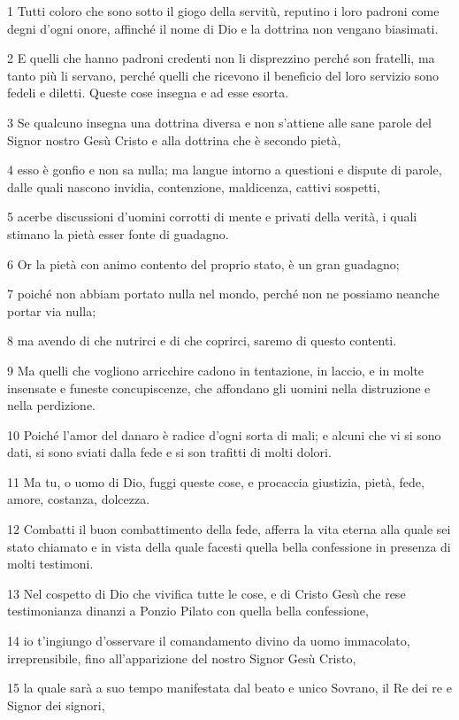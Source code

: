 \par 1 Tutti coloro che sono sotto il giogo della servitù, reputino i loro padroni come degni d'ogni onore, affinché il nome di Dio e la dottrina non vengano biasimati.
\par 2 E quelli che hanno padroni credenti non li disprezzino perché son fratelli, ma tanto più li servano, perché quelli che ricevono il beneficio del loro servizio sono fedeli e diletti. Queste cose insegna e ad esse esorta.
\par 3 Se qualcuno insegna una dottrina diversa e non s'attiene alle sane parole del Signor nostro Gesù Cristo e alla dottrina che è secondo pietà,
\par 4 esso è gonfio e non sa nulla; ma langue intorno a questioni e dispute di parole, dalle quali nascono invidia, contenzione, maldicenza, cattivi sospetti,
\par 5 acerbe discussioni d'uomini corrotti di mente e privati della verità, i quali stimano la pietà esser fonte di guadagno.
\par 6 Or la pietà con animo contento del proprio stato, è un gran guadagno;
\par 7 poiché non abbiam portato nulla nel mondo, perché non ne possiamo neanche portar via nulla;
\par 8 ma avendo di che nutrirci e di che coprirci, saremo di questo contenti.
\par 9 Ma quelli che vogliono arricchire cadono in tentazione, in laccio, e in molte insensate e funeste concupiscenze, che affondano gli uomini nella distruzione e nella perdizione.
\par 10 Poiché l'amor del danaro è radice d'ogni sorta di mali; e alcuni che vi si sono dati, si sono sviati dalla fede e si son trafitti di molti dolori.
\par 11 Ma tu, o uomo di Dio, fuggi queste cose, e procaccia giustizia, pietà, fede, amore, costanza, dolcezza.
\par 12 Combatti il buon combattimento della fede, afferra la vita eterna alla quale sei stato chiamato e in vista della quale facesti quella bella confessione in presenza di molti testimoni.
\par 13 Nel cospetto di Dio che vivifica tutte le cose, e di Cristo Gesù che rese testimonianza dinanzi a Ponzio Pilato con quella bella confessione,
\par 14 io t'ingiungo d'osservare il comandamento divino da uomo immacolato, irreprensibile, fino all'apparizione del nostro Signor Gesù Cristo,
\par 15 la quale sarà a suo tempo manifestata dal beato e unico Sovrano, il Re dei re e Signor dei signori,
